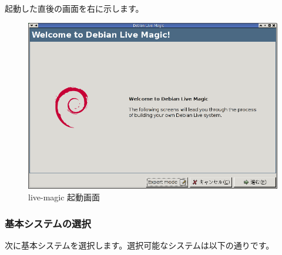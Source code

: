 \documentclass[mingoth,a4paper]{jsarticle}
\begin{document}
\begin{multicols}{2}
 起動した直後の画面を右に示します。

 \begin{figure}[H]
 \begin{center}
  \includegraphics[width=1\hsize]{image200711/live-magic00.png}
 \end{center}
 \caption{live-magic 起動画面}
 \label{live-magic00}
 \end{figure}
\end{multicols}


\subsubsection{基本システムの選択}
次に基本システムを選択します。選択可能なシステムは以下の通りです。
\end{document}
